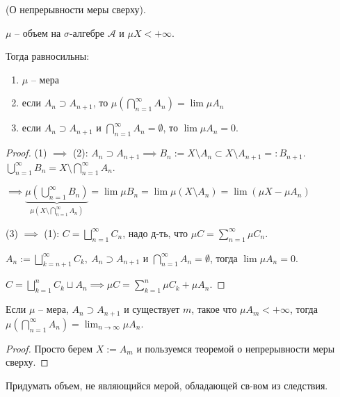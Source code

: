 \begin{theorem}
    (О непрерывности меры сверху).

    $\mu$ -- объем на $\sigma$-алгебре $\mathcal{A}$ и $\mu X < +\infty$.

    Тогда равносильны: 
    \begin{enumerate}
        \item $\mu$ -- мера
        \item если $A_n \supset A_{n+1}$, то $\mu \left(\bigcap_{n=1}^{\infty} A_n\right) = \lim \mu A_n$
        \item если $A_n \supset A_{n+1}$ и $\bigcap_{n=1}^{\infty} A_n = \emptyset$, то $\lim \mu A_n = 0$.
    \end{enumerate}
\end{theorem}

\begin{proof}
    (1) $\implies $ (2): $A_n \supset A_{n+1} \implies B_n := X \setminus A_n \subset X \setminus A_{n+1} =: B_{n+1}$. $\bigcup_{n=1}^{\infty} B_n = X \setminus \bigcap_{n=1}^{\infty} A_n$.

    $\implies \underbrace{\mu \left( \bigcup_{n=1}^{\infty} B_n \right)}_{\mu (X \setminus \bigcap_{n=1}^{\infty} A_n)} = \lim \mu B_n = \lim \mu (X \setminus A_n) = \lim (\mu X - \mu A_n)$


    (3) $\implies $ (1): $C = \bigsqcup_{n=1}^{\infty} C_n$, надо д-ть, что $\mu C = \sum_{n=1}^{\infty} \mu C_n$.

    $A_n := \bigsqcup_{k=n + 1}^{\infty} C_k, \ A_n \supset A_{n+1}$ и $\bigcap_{n=1}^{\infty} A_n = \emptyset$, тогда $\lim \mu A_n = 0$.

    $C = \bigsqcup_{k=1}^{n} C_k \sqcup A_n \implies \mu C  = \sum_{k=1}^{n} \mu C_k + \mu A_n$.
\end{proof}

\begin{consequence}
    Если $\mu$ -- мера, $A_n \supset A_{n+1}$ и существует $m$, такое что $\mu A_m < +\infty$, тогда $\mu (\bigcap_{n=1}^{\infty} A_n) = \lim_{n \rightarrow \infty} {\mu A_n}$.
\end{consequence}
\begin{proof}
    Просто берем $X := A_m$ и пользуемся теоремой о непрерывности меры сверху.
\end{proof}
\begin{exerc}
    Придумать объем, не являющийся мерой, обладающей св-вом из следствия. 
\end{exerc}

